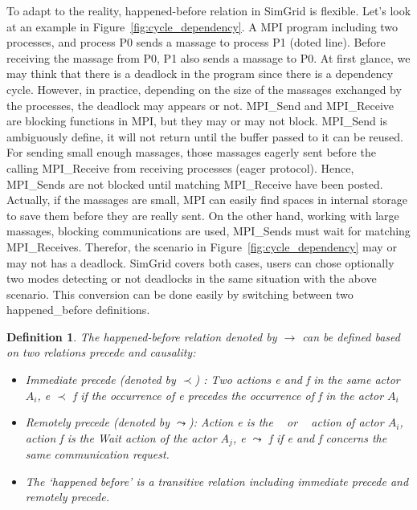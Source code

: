 \documentclass[a4paper,11pt]{article}
\newtheorem{definition}{Definition}
\begin{document}
 To adapt to the reality, happened-before relation in SimGrid is flexible. Let's look at an example in Figure~\ref{fig:cycle_dependency}. A MPI program including two processes, and process P0 sends a massage to process P1 (doted line). Before receiving  the massage from P0, P1 also sends a massage to P0. At first glance, we may think that there is a deadlock in the program since there is a dependency cycle. However, in practice, depending on the size of the massages exchanged by the processes, the deadlock may appears or not. MPI\_Send and MPI\_Receive are blocking functions in MPI, but they may or may not block. MPI\_Send is ambiguously define, it will not return until the buffer passed to it can be reused. For sending small enough massages, those massages eagerly sent before the calling MPI\_Receive from receiving processes (eager protocol). Hence, MPI\_Sends are not blocked until matching MPI\_Receive have been posted. Actually, if the massages are small, MPI can easily find spaces in internal storage to save them before they are really sent. On the other hand, working with large massages, blocking communications are used, MPI\_Sends must wait for matching MPI\_Receives. Therefor, the scenario in Figure~\ref{fig:cycle_dependency} may or may not has a deadlock. SimGrid covers both cases, users can chose optionally two modes detecting or not deadlocks in the same situation with the above scenario. This conversion can be done easily by switching between two happened\_before definitions.    
  \begin{definition}
  	\label{def:happedBefore1}
  The happened-before relation  denoted by  $\rightarrow $ can be defined based on two relations precede and causality: \begin{itemize}
  	\item Immediate precede (denoted by $ \prec$) :  Two actions e and f in the same actor $A_i$, e $ \prec$ f if the occurrence of e precedes the occurrence of f in the actor $A_i$  
  	\item Remotely precede (denoted by $\leadsto$): Action e is the \asynsend~ or \asynreceive~ action of actor $A_i$, action f is the Wait action of the actor $A_j$,  e $\leadsto$ f if e and f concerns the same communication request.
  	\item The ‘happened before’ is a transitive relation including immediate precede and remotely precede. 
  \end{itemize}\end{definition} 
  
\end{document}
